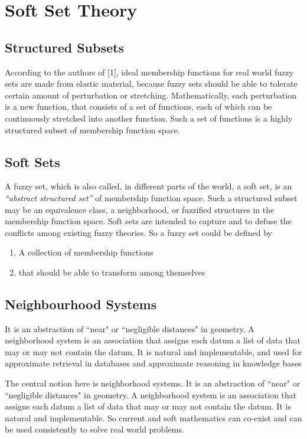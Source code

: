 \documentclass[12pt]{article} %
\begin{document}
\section{Soft Set Theory}

\subsection{Structured Subsets}
According to the authors of [1], ideal membership functions for real world fuzzy sets are made from elastic material, because fuzzy sets should be able to tolerate certain
amount of perturbation or stretching. Mathematically, each perturbation is a new function, that consists of a set of functions,
each of which can be continuously stretched into
another function. Such a set of functions is a highly
structured subset of membership function space. 

\subsection{Soft Sets}
A fuzzy set, which is also called, in different parts of the world, a soft set, is an \textit{“abstract structured set”} of
membership function space. Such a structured subset
may be an equivalence class, a neighborhood, or
fuzzified structures in the membership function space. Soft sets are intended to capture and to defuse the conflicts among existing fuzzy theories. So a fuzzy set could be defined by 
\begin{enumerate}
\item{A collection of membership functions}
\item{that should be able to transform among themselves}
\end{enumerate}


\subsection{Neighbourhood Systems}
It is an abstraction of ``near" or ``negligible distances" in
geometry. A neighborhood system is an association that
assigns each datum a list of data that may or may not
contain the datum. It is natural and implementable, and used for  approximate retrieval in databases and approximate reasoning in knowledge bases

The central notion here is neighborhood systems. It
is an abstraction of ``near" or ``negligible distances" in
geometry. A neighborhood system is an association that
assigns each datum a list of data that may or may not
contain the datum. It is natural and implementable. So current and soft mathematics can
co-exist and can be used consistently to solve real
world problems.
\end{document}
